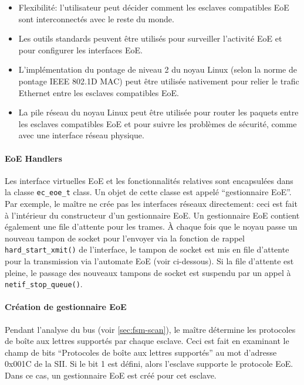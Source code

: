 \documentclass[a4paper,12pt,BCOR6mm,bibtotoc,idxtotoc]{scrbook}
\begin{document}
\begin{itemize}

\item Flexibilit\'e: l'utilisateur peut d\'ecider comment les esclaves
  compatibles EoE sont interconnect\'es avec le reste du monde.

\item Les outils standards peuvent \^etre utilis\'es pour surveiller
  l'activit\'e EoE et pour configurer les interfaces EoE.

\item L'impl\'ementation du pontage de niveau 2 du noyau Linux (selon la
  norme de pontage IEEE 802.1D MAC) peut \^etre utilis\'ee nativement pour
  relier le trafic Ethernet entre les esclaves compatibles EoE.

\item La pile r\'eseau du noyau Linux peut \^etre utilis\'ee pour router les
  paquets entre les esclaves compatibles EoE et pour suivre les
  probl\`emes de s\'ecurit\'e, comme avec une interface r\'eseau physique.

\end{itemize}

\paragraph{EoE Handlers}

Les interface virtuelles EoE et les fonctionnalit\'es relatives sont
encapsul\'ees dans la classe \lstinline+ec_eoe_t+ class.  Un objet de
cette classe est appel\'e ``gestionnaire EoE''.  Par exemple, le ma\^itre
ne cr\'ee pas les interfaces r\'eseaux directement: ceci est fait \`a
l'int\'erieur du constructeur d'un gestionnaire EoE.  Un gestionnaire
EoE contient \'egalement une file d'attente pour les trames.  \`A chaque
fois que le noyau passe un nouveau tampon de socket pour l'envoyer via la
fonction de rappel \lstinline+hard_start_xmit()+ de l'interface, le
tampon de socket est mis en file d'attente pour la transmission via
l'automate EoE (voir ci-dessous).  Si la file d'attente est pleine, le
passage des nouveaux tampons de socket est suspendu par un appel \`a
\lstinline+netif_stop_queue()+.

\paragraph{Cr\'eation de gestionnaire EoE}

Pendant l'analyse du bus (voir \autoref{sec:fsm-scan}), le ma\^itre
d\'etermine les protocoles de bo\^ite aux lettres support\'es par chaque
esclave. Ceci est fait en examinant le champ de bits ``Protocoles de
bo\^ite aux lettres support\'es'' au mot d'adresse 0x001C de la SII. Si le
bit 1 est d\'efini, alors l'esclave supporte le protocole EoE. Dans ce
cas, un gestionnaire EoE est cr\'e\'e pour cet esclave.
\end{document}
